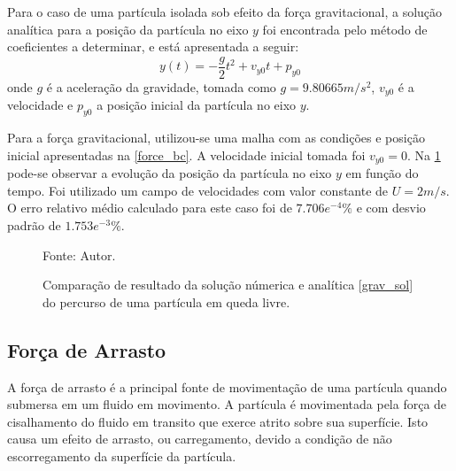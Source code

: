 Para o caso de uma partícula isolada sob efeito da força gravitacional, a solução analítica para a posição da partícula no eixo $y$ foi encontrada pelo método de coeficientes a determinar, e está apresentada a seguir:
\begin{equation}
    y(t) = -\dfrac{g}{2}t^2 + v_{y0}t + p_{y0}
    \label{grav_sol} 
\end{equation}
onde $g$ é a aceleração da gravidade, tomada como $g=9.80665m/s^2$, $v_{y0}$ é a velocidade e $p_{y0}$ a posição inicial da partícula no eixo $y$.

Para a força gravitacional, utilizou-se uma malha com as condições e posição inicial apresentadas na \ref{force_bc}.
A velocidade inicial tomada foi $v_{y0}=0$.
Na \ref{grav_comp} pode-se observar a evolução da posição da partícula no eixo $y$ em função do tempo.
Foi utilizado um campo de velocidades com valor constante de $U=2m/s$.
O erro relativo médio calculado para este caso foi de $7.706e^{-4}\%$ e com desvio padrão de $1.753e^{-3}\%$.
\begin{figure}[H]
    \centering
     {\raggedleft \scriptsize Fonte: Autor.}
    \caption{Comparação de resultado da solução númerica e analítica \ref{grav_sol} do percurso de uma partícula em queda livre.}
    \label{grav_comp}
\end{figure}

\subsection{\textbf{Força de Arrasto}}
\label{sec_drag}
A força de arrasto é a principal fonte de movimentação de uma partícula quando submersa em um fluido em movimento.
A partícula é movimentada pela força de cisalhamento do fluido em transito que exerce atrito sobre sua superfície.
Isto causa um efeito de arrasto, ou carregamento, devido a condição de não escorregamento da superfície da partícula.

